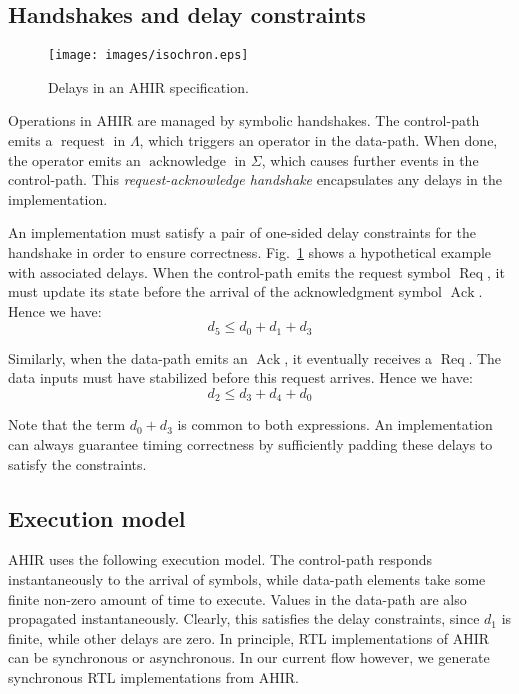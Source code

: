 \documentclass[conference]{IEEEtran}
\newcommand{\sym}[1]{$\operatorname{#1}$}
\begin{document}
\subsection{Handshakes and delay constraints}
\label{sect:handshakes}

\begin{figure}[!t]
\centering
\texttt{[image: images/isochron.eps]}
\caption{Delays in an AHIR specification.}
\label{fig:isochron}
\end{figure}

Operations in AHIR are managed by symbolic handshakes. The
control-path emits a \sym{request} in $\Lambda$, which triggers an
operator in the data-path. When done, the operator emits an
\sym{acknowledge} in $\Sigma$, which causes further events in the
control-path. This \emph{request-acknowledge handshake} encapsulates
any delays in the implementation.

An implementation must satisfy a pair of one-sided delay constraints
for the handshake in order to ensure correctness.
Fig.~\ref{fig:isochron} shows a hypothetical example with associated
delays. When the control-path emits the request symbol \sym{Req}, it
must update its state before the arrival of the acknowledgment symbol
\sym{Ack}. Hence we have:
\[d_5 \le d_0 + d_1 + d_3\]

Similarly, when the data-path emits an \sym{Ack}, it eventually
receives a \sym{Req}. The data inputs must have stabilized before
this request arrives. Hence we have:
\[d_2 \le d_3 + d_4 + d_0\]

Note that the term $d_0 + d_3$ is common to both expressions. An
implementation can always guarantee timing correctness by sufficiently
padding these delays to satisfy the constraints.

\subsection{Execution model}

AHIR uses the following execution model. The control-path responds
instantaneously to the arrival of symbols, while data-path elements
take some finite non-zero amount of time to execute. Values in the data-path are also
propagated instantaneously. Clearly, this satisfies the delay
constraints, since $d_1$ is finite, while other delays are zero.  
In principle, RTL implementations of AHIR can be synchronous or asynchronous.  In 
our current flow however, we generate synchronous RTL implementations from
AHIR.
\end{document}
